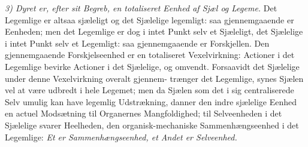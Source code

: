 \documentclass[12pt,a4paper]{book}
\begin{document}
\emph{3) Dyret er, efter sit Begreb, en totaliseret Eenhed af Sjæl og Legeme.}
Det Legemlige er altsaa sjæleligt og det Sjælelige legemligt: saa gjennemgaaende
er Eenheden; men det Legemlige er dog i intet Punkt selv et Sjæleligt, det
Sjælelige i intet Punkt selv et Legemligt: saa gjennemgaaende er Forskjellen.
Den gjennemgaaende Forskjelseenhed er en totaliseret Vexelvirkning: Actioner i
det Legemlige bevirke Actioner i det Sjælelige, og omvendt. Forsaavidt det
Sjælelige under denne Vexelvirkning overalt gjennem-
\setcounter{footnote}{0}
trænger det Legemlige, synes Sjælen vel at være udbredt i hele Legemet; men da
Sjælen som det i sig centraliserede Selv umulig kan have legemlig Udstrækning,
danner den indre sjælelige Eenhed en actuel Modsætning til Organernes
Mangfoldighed; til Selveenheden i det Sjælelige svarer Heelheden, den
organisk-mechaniske Sammenhængseenhed i det Legemlige: \emph{Et er
Sammenhængseenhed, et Andet er Selveenhed.}
\end{document}
